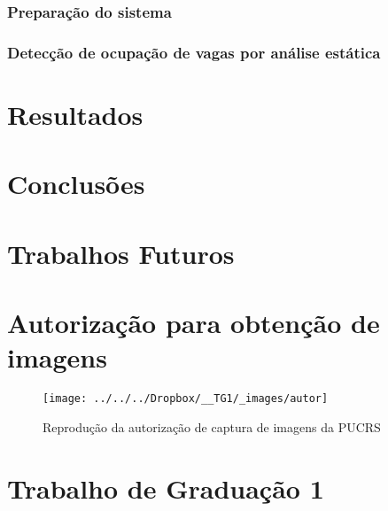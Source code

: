 \documentclass[ecp,tc]{iiufrgs}
\begin{document}
\subsection{Preparação do sistema}

\subsection{Detecção de ocupação de vagas por análise estática}

\chapter{Resultados}

\chapter{Conclusões}

\chapter{Trabalhos Futuros}

\nocite{Sobral2014}
\nocite{6264659}
\nocite{KaewTraKulPong2002}
\nocite{BinZabawi2013}
\nocite{Lin2006}



\annex
\chapter{Autorização para obtenção de imagens}
\label{autoriz}
\begin{figure}[h]
	\caption{Reprodução da autorização de captura de imagens da PUCRS}
	\centering
	\texttt{[image: ../../../Dropbox/\_\_TG1/\_images/autor]}
	\label{fig:autor}
\end{figure}


\chapter{Trabalho de Graduação 1}
\label{tg1}
\end{document}
